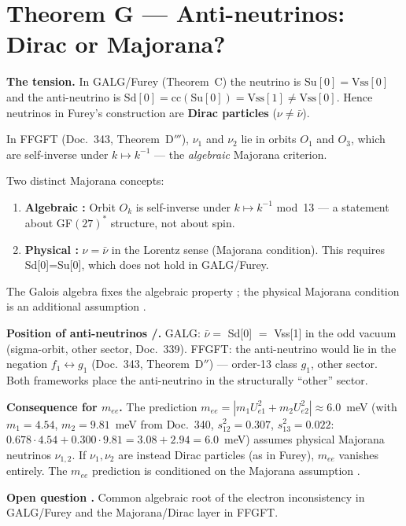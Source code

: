 \section{Theorem G --- Anti-neutrinos: Dirac or Majorana?}

\textbf{The tension.} In GALG/Furey (Theorem~C) the neutrino is
$\mathrm{Su}[0]=\mathrm{Vss}[0]$ and the anti-neutrino is $\mathrm{Sd}[0]=\mathrm{cc}(\mathrm{Su}[0])=\mathrm{Vss}[1]\neq\mathrm{Vss}[0]$.
Hence neutrinos in Furey's construction are \textbf{Dirac particles} ($\nu\neq\bar\nu$).

In FFGFT (Doc.~343, Theorem~D$'''$), $\nu_1$ and $\nu_2$ lie in orbits $O_1$ and $O_3$,
which are self-inverse under $k\mapsto k^{-1}$ --- the \emph{algebraic} Majorana criterion.

\begin{theorem}
Two distinct Majorana concepts:
\begin{enumerate}
\item \textbf{Algebraic \BM:} Orbit $O_k$ is self-inverse under $k\mapsto k^{-1}$ mod~13
--- a statement about GF$(27)^*$ structure, not about spin.
\item \textbf{Physical \SM:} $\nu=\bar\nu$ in the Lorentz sense (Majorana condition).
This requires Sd[0]=Su[0], which does not hold in GALG/Furey.
\end{enumerate}
The Galois algebra fixes the algebraic property \BM; the physical Majorana
condition is an additional assumption \SM.
\end{theorem}

\textbf{Position of anti-neutrinos \BM/\SM.}
GALG: $\bar\nu=$ Sd[0] $=$ Vss[1] in the odd vacuum (sigma-orbit, other sector, Doc.~339).
FFGFT: the anti-neutrino would lie in the negation $f_1\leftrightarrow g_1$
(Doc.~343, Theorem~D$''$) --- order-13 class $g_1$, other sector.
Both frameworks place the anti-neutrino in the structurally ``other'' sector.

\textbf{Consequence for $m_{ee}$.}
The prediction $m_{ee} = |m_1 U_{e1}^2 + m_2 U_{e2}^2| \approx 6.0$~meV
(with $m_1 = 4.54$, $m_2 = 9.81$~meV from Doc.~340, $s_{12}^2 = 0.307$, $s_{13}^2 = 0.022$:
$0.678\cdot4.54 + 0.300\cdot9.81 = 3.08 + 2.94 = 6.0$~meV) assumes physical Majorana neutrinos
$\nu_{1,2}$. If $\nu_1,\nu_2$ are instead Dirac particles (as in Furey), $m_{ee}$ vanishes entirely.
The $m_{ee}$ prediction is conditioned on the Majorana assumption \SM.

\textbf{Open question \SM.} Common algebraic root of the electron inconsistency
in GALG/Furey and the Majorana/Dirac layer in FFGFT.

